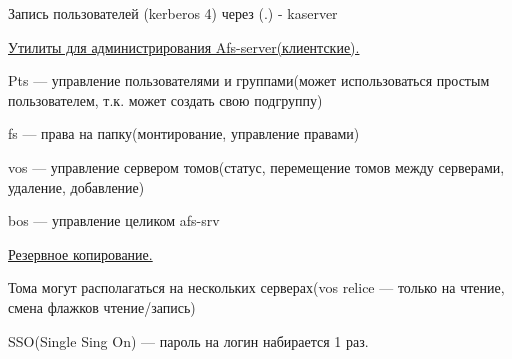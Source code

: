 \par 
Запись пользователей (kerberos 4) через (.) -
kaserver
\par 
\underline{Утилиты для администрирования
Afs-server(клиентские).}
\par 
Pts — управление пользователями и
группами(может использоваться простым
пользователем, т.к. может создать свою
подгруппу)
\par 
fs — права на папку(монтирование,
управление правами)
\par 
vos — управление сервером томов(статус,
перемещение томов между серверами,
удаление, добавление)
\par 
bos — управление целиком afs-srv
\par 
\underline{Резервное копирование.}
\par 
Тома могут располагаться на нескольких
серверах(vos relice — только на чтение, смена
флажков чтение/запись)
\par 
SSO(Single Sing On) — пароль на логин набирается
1 раз.
